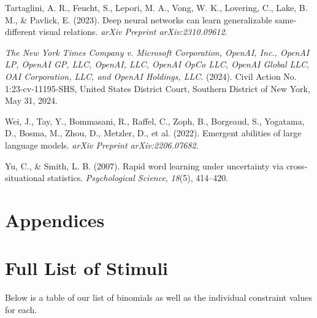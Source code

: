 \documentclass[
  nottoc]{article}
\newlength{\cslhangindent}
\newenvironment{CSLReferences}[2] %
 {\begin{list}{}{%
  \setlength{\itemindent}{0pt}
  \setlength{\leftmargin}{0pt}
  \setlength{\parsep}{0pt}
  \ifodd #1
   \setlength{\leftmargin}{\cslhangindent}
   \setlength{\itemindent}{-1\cslhangindent}
  \fi
  \setlength{\itemsep}{#2\baselineskip}}}
 {\end{list}}
\begin{document}
\begin{CSLReferences}{1}{0}
Tartaglini, A. R., Feucht, S., Lepori, M. A., Vong, W. K., Lovering, C.,
Lake, B. M., \& Pavlick, E. (2023). Deep neural networks can learn
generalizable same-different visual relations. \emph{arXiv Preprint
arXiv:2310.09612}.

\emph{{The New York Times Company v. Microsoft Corporation, OpenAI,
Inc., OpenAI LP, OpenAI GP, LLC, OpenAI, LLC, OpenAI OpCo LLC, OpenAI
Global LLC, OAI Corporation, LLC, and OpenAI Holdings, LLC}}. (2024).
Civil Action No. 1:23-cv-11195-SHS, United States District Court,
Southern District of New York, May 31, 2024.

Wei, J., Tay, Y., Bommasani, R., Raffel, C., Zoph, B., Borgeaud, S.,
Yogatama, D., Bosma, M., Zhou, D., Metzler, D., et al. (2022). Emergent
abilities of large language models. \emph{arXiv Preprint
arXiv:2206.07682}.

Yu, C., \& Smith, L. B. (2007). Rapid word learning under uncertainty
via cross-situational statistics. \emph{Psychological Science},
\emph{18}(5), 414--420.

\end{CSLReferences}

\newpage

\section*{Appendices}\label{appendices}

\appendix

\renewcommand{\thesection}{\Alph{section}}

\setcounter{section}{0}



\section{Full List of Stimuli}\label{sec-full-list-of-stimuli}

Below is a table of our list of binomials as well as the individual
constraint values for each.
\end{document}
